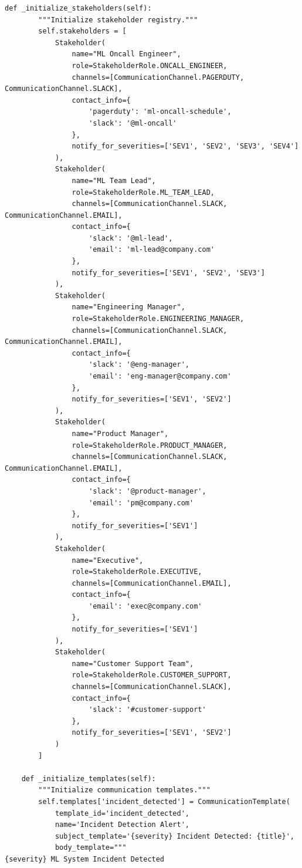 \begin{lstlisting}[style=python, caption={Incident communication with multi-channel notifications}]
    def _initialize_stakeholders(self):
        """Initialize stakeholder registry."""
        self.stakeholders = [
            Stakeholder(
                name="ML Oncall Engineer",
                role=StakeholderRole.ONCALL_ENGINEER,
                channels=[CommunicationChannel.PAGERDUTY, CommunicationChannel.SLACK],
                contact_info={
                    'pagerduty': 'ml-oncall-schedule',
                    'slack': '@ml-oncall'
                },
                notify_for_severities=['SEV1', 'SEV2', 'SEV3', 'SEV4']
            ),
            Stakeholder(
                name="ML Team Lead",
                role=StakeholderRole.ML_TEAM_LEAD,
                channels=[CommunicationChannel.SLACK, CommunicationChannel.EMAIL],
                contact_info={
                    'slack': '@ml-lead',
                    'email': 'ml-lead@company.com'
                },
                notify_for_severities=['SEV1', 'SEV2', 'SEV3']
            ),
            Stakeholder(
                name="Engineering Manager",
                role=StakeholderRole.ENGINEERING_MANAGER,
                channels=[CommunicationChannel.SLACK, CommunicationChannel.EMAIL],
                contact_info={
                    'slack': '@eng-manager',
                    'email': 'eng-manager@company.com'
                },
                notify_for_severities=['SEV1', 'SEV2']
            ),
            Stakeholder(
                name="Product Manager",
                role=StakeholderRole.PRODUCT_MANAGER,
                channels=[CommunicationChannel.SLACK, CommunicationChannel.EMAIL],
                contact_info={
                    'slack': '@product-manager',
                    'email': 'pm@company.com'
                },
                notify_for_severities=['SEV1']
            ),
            Stakeholder(
                name="Executive",
                role=StakeholderRole.EXECUTIVE,
                channels=[CommunicationChannel.EMAIL],
                contact_info={
                    'email': 'exec@company.com'
                },
                notify_for_severities=['SEV1']
            ),
            Stakeholder(
                name="Customer Support Team",
                role=StakeholderRole.CUSTOMER_SUPPORT,
                channels=[CommunicationChannel.SLACK],
                contact_info={
                    'slack': '#customer-support'
                },
                notify_for_severities=['SEV1', 'SEV2']
            )
        ]

    def _initialize_templates(self):
        """Initialize communication templates."""
        self.templates['incident_detected'] = CommunicationTemplate(
            template_id='incident_detected',
            name='Incident Detection Alert',
            subject_template='{severity} Incident Detected: {title}',
            body_template="""
{severity} ML System Incident Detected


\end{lstlisting}
